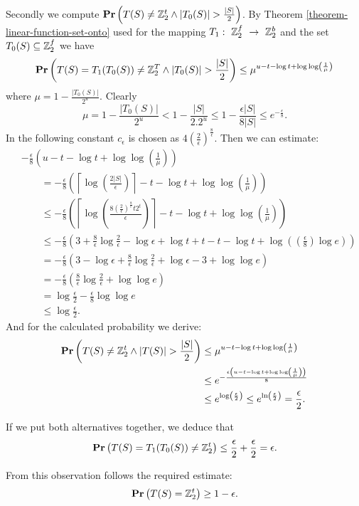 Secondly we compute $\mathbf{Pr}\left(T(S) \neq \mathbb{Z}_{2}^{t} \wedge |T_0(S)| > \frac{|S|}{2}\right)$. By Theorem \ref{theorem-linear-function-set-onto} used for the mapping $T_1:~\mathbb{Z}_{2}^{f}~\rightarrow~\mathbb{Z}_{2}^{b}$ and the set $T_0(S) \subseteq \mathbb{Z}_{2}^{f}$ we have
\[
	\mathbf{Pr}\left(T(S) = T_1(T_0(S)) \neq \mathbb{Z}_{2}^{T} \wedge |T_0(S)| > \frac{|S|}{2}\right) \leq \mu ^ {u - t - \log t  +\log\log \left(\frac{1}{\mu}\right) } 
\]
where $\mu = 1- \frac{|T_0(S)|}{2^u}$. Clearly
\[
\mu = 1 - \frac{|T_0(S)|}{2 ^ u} < 1 - \frac{|S|}{2 . 2 ^ u} \leq 1 - \frac{\epsilon |S|}{8|S|} \leq e^{-\frac{\epsilon}{8}}
\text{.}
\]
In the following constant $c_{\epsilon}$ is chosen as $4\left(\frac{2}{\epsilon}\right) ^ {\frac{8}{\epsilon}}$. Then we can estimate:
\[
\begin{split}
& -\frac{\epsilon}{8} \left(u - t - \log t + \log \log \left( \frac{1}{\mu} \right) \right) \\
& \qquad = -\frac{\epsilon}{8}\left(\left\lceil\log\left(\frac{2|S|}{\epsilon}\right)\right\rceil - t - \log t + \log\log\left(\frac{1}{\mu}\right)\right) \\
& \qquad \leq -\frac{\epsilon}{8} \left( \left\lceil \log\left( \frac{8 \left(\frac{2}{\epsilon}\right) ^ {\frac{8}{\epsilon}}t2^t}{\epsilon} \right) \right\rceil - t - \log t + \log\log\left(\frac{1}{\mu}\right)\right) \\
& \qquad \leq -\frac{\epsilon}{8} \left(3 + \frac{8}{\epsilon}\log\frac{2}{\epsilon} - \log\epsilon + \log t + t - t - \log t + \log \left( \left(\frac{\epsilon}{8}\right)\log e \right) \right) \\
& \qquad = -\frac{\epsilon}{8} \left(3 - \log\epsilon + \frac{8}{\epsilon} \log \frac{2}{\epsilon} + \log\epsilon - 3 + \log\log e\right) \\
& \qquad = -\frac{\epsilon}{8}\left(\frac{8}{\epsilon}\log \frac{2}{\epsilon} + \log\log e\right) \\
& \qquad = \log \frac{\epsilon}{2} - \frac{\epsilon}{8} \log\log e \\
& \qquad \leq \log\frac{\epsilon}{2} \text{.}
\end{split}
\]
And for the calculated probability we derive:
\[
\begin{split}
\mathbf{Pr}\left(T(S) \neq \mathbb{Z}_{2}^{t} \wedge |T(S)| > \frac{|S|}{2}\right) 
	& \leq \mu ^ {u - t - \log t + \log\log\left(\frac{1}{\mu}\right)} \\
	& \leq e ^ {-\frac{\epsilon\left(u - t - \log t + \log\log\left(\frac{1}{\mu}\right)\right)}{8}} \\
	& \leq e ^ {\log \left( \frac{\epsilon}{2} \right)} \leq e ^ {\ln \left(\frac{\epsilon}{2}\right)} = \frac{\epsilon}{2} \text{.}
\end{split}
\]

If we put both alternatives together, we deduce that 
\[ 
	\mathbf{Pr}\left(T(S) = T_1(T_0(S)) \neq \mathbb{Z}_{2}^{t}\right) \leq \frac{\epsilon}{2} + \frac{
\epsilon}{2} = \epsilon \text{.}
\]


From this observation follows the required estimate: \[ \mathbf{Pr}\left(T(S) = \mathbb{Z}_{2}^{t}\right) \geq 1 - \epsilon \text{.} \]
